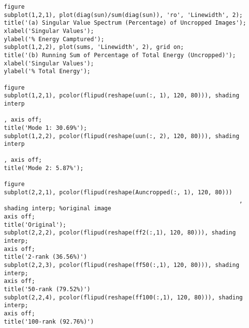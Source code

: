\documentclass[12pt,a4paper]{article}
\begin{document}
\begin{verbatim}
figure
subplot(1,2,1), plot(diag(sun)/sum(diag(sun)), 'ro', 'Linewidth', 2);
title('(a) Singular Value Spectrum (Percentage) of Uncropped Images');
xlabel('Singular Values');
ylabel('% Energy Camptured');
subplot(1,2,2), plot(sums, 'Linewidth', 2), grid on;
title('(b) Running Sum of Percentage of Total Energy (Uncropped)');
xlabel('Singular Values');
ylabel('% Total Energy');

figure
subplot(1,2,1), pcolor(flipud(reshape(uun(:, 1), 120, 80))), shading interp
																						, axis off;
title('Mode 1: 30.69%');
subplot(1,2,2), pcolor(flipud(reshape(uun(:, 2), 120, 80))), shading interp
																						, axis off;
title('Mode 2: 5.87%');

figure
subplot(2,2,1), pcolor(flipud(reshape(Auncropped(:, 1), 120, 80)))
																	, shading interp; %original image
axis off;
title('Original');
subplot(2,2,2), pcolor(flipud(reshape(ff2(:,1), 120, 80))), shading interp;
axis off;
title('2-rank (36.56%)')
subplot(2,2,3), pcolor(flipud(reshape(ff50(:,1), 120, 80))), shading interp;
axis off;
title('50-rank (79.52%)')
subplot(2,2,4), pcolor(flipud(reshape(ff100(:,1), 120, 80))), shading interp;
axis off;
title('100-rank (92.76%)')
\end{verbatim}
\end{document}
